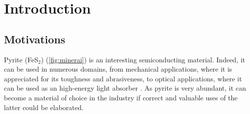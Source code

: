 \documentclass[11pt,a4paper]{article}
\makeatletter
\newcommand{\authors}{%
  \setlength\arrayrulewidth{2pt}
  \begin{tabular}{l|l}
  \@authorsi
}
\newcommand\@authorsi{\@ifnextchar\stopauthors{\@authorsend}{\@authorsii}}
\newcommand\@authorsii[2]{%
  \\
  \textbf{\Large #1} &  \textbf{\Large #2}
  \\
  \@authorsi %
}
\newcommand\@authorsend[1]{
  \end{tabular}}
\def \classSigle{LMAPR2451}
\def \className{Atomistic and nanoscopic simulations}
\def \workName{Study of pyrite / FeS$_\text{2}$ and its optical properties}
\def \professors{Professors Jean-Christophe Charlier, Xavier Gonze \& Gian-Marco Rignanese\\Mentors : Alexandre Cloots \& Ionel-Bogdan Guster}
\def \academicYear{2020-2021}
\def \abstractText{This report aims to investigate the optical properties of pyrite (FeS$_\text{2}$). To do so, \textit{ab initio} computations are first performed on a 6-atoms unit cell. The convergence with respect to several structural parameters is also studied. The optical properties are then analyzed in the light of the obtained results. Finally, a comparison is made with the already existing documentation, and a discussion about the quality of the simulation is made.}
\makeatother
\begin{document}
\tableofcontents
\newpage
\section{Introduction}
\subsection{Motivations}
Pyrite (FeS$_2$) (\autoref{fig:minerai}) is an interesting semiconducting material. Indeed, it can be used in numerous domains, from mechanical applications, where it is appreciated for its toughness and abrasiveness, to optical applications, where it can be used as an high-energy light absorber \cite{pyriteApps}. As pyrite is very abundant, it can become a material of choice in the industry if correct and valuable uses of the latter could be elaborated.
\end{document}
